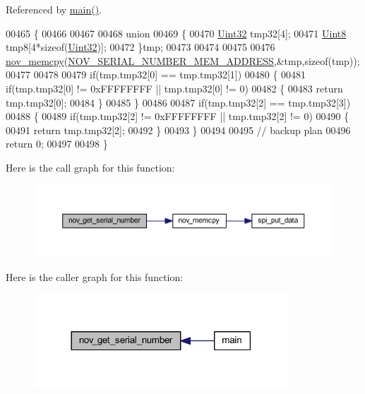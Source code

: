 Referenced by \hyperlink{a00048_source_l00080}{main()}.


\begin{DoxyCode}
00465 \{
00466 
00467 
00468     \textcolor{keyword}{union}
00469     \{
00470         \hyperlink{a00072_aba99025e657f892beb7ff31cecf64653}{Uint32} tmp32[4];
00471         \hyperlink{a00072_af84840501dec18061d18a68c162a8fa2}{Uint8}  tmp8[4*\textcolor{keyword}{sizeof}(\hyperlink{a00072_aba99025e657f892beb7ff31cecf64653}{Uint32})];
00472     \}tmp;
00473 
00474 
00475 
00476     \hyperlink{a00060_a3ff681f3af83ec441535611dac6ada16}{nov\_memcpy}(\hyperlink{a00029_ab7dc1ea8a7f6e16cf27fbfe88efd7285}{NOV\_SERIAL\_NUMBER\_MEM\_ADDRESS},&tmp,\textcolor{keyword}{sizeof}(tmp));
00477 
00478 
00479     \textcolor{keywordflow}{if}(tmp.tmp32[0] == tmp.tmp32[1])
00480     \{
00481         \textcolor{keywordflow}{if}(tmp.tmp32[0] != 0xFFFFFFFF || tmp.tmp32[0] != 0)
00482         \{
00483             \textcolor{keywordflow}{return}  tmp.tmp32[0];
00484         \}
00485     \}
00486 
00487     \textcolor{keywordflow}{if}(tmp.tmp32[2] == tmp.tmp32[3])
00488     \{
00489         \textcolor{keywordflow}{if}(tmp.tmp32[2] != 0xFFFFFFFF || tmp.tmp32[2] != 0)
00490         \{
00491             \textcolor{keywordflow}{return}  tmp.tmp32[2];
00492         \}
00493     \}
00494 
00495     \textcolor{comment}{// backup plan}
00496     \textcolor{keywordflow}{return} 0;
00497         
00498 \}
\end{DoxyCode}


Here is the call graph for this function\+:
\nopagebreak
\begin{figure}[H]
\begin{center}
\leavevmode
\includegraphics[width=350pt]{d5/d16/a00029_a86b863ea185628aff5a00b4defbbb6e1_cgraph}
\end{center}
\end{figure}




Here is the caller graph for this function\+:
\nopagebreak
\begin{figure}[H]
\begin{center}
\leavevmode
\includegraphics[width=270pt]{d5/d16/a00029_a86b863ea185628aff5a00b4defbbb6e1_icgraph}
\end{center}
\end{figure}


